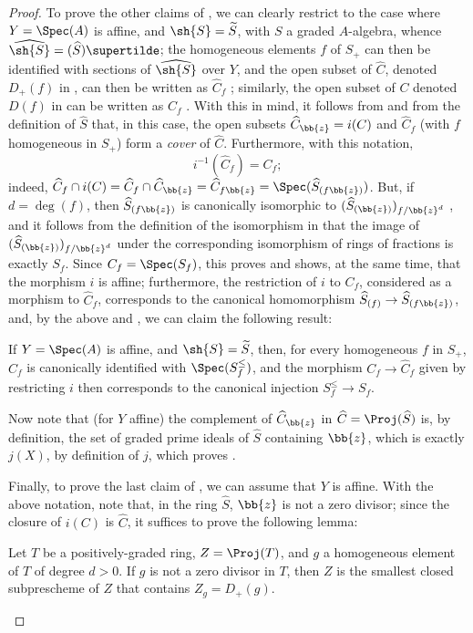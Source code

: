 \begin{proof}
To prove the other claims of , we can clearly restrict to the case where $Y=\Spec(A)$ is affine, and $\sh{S}=\widetilde{S}$, with $S$ a graded $A$-algebra, whence $\widehat{\sh{S}}=(\widehat{S})\supertilde$;
the homogeneous elements $f$ of $S_+$ can then be identified with sections of $\widehat{\sh{S}}$ over $Y$, and the open subset of $\widehat{C}$, denoted $D_+(f)$ in , can then be written as $\widehat{C}_f$ ;
similarly, the open subset of $C$ denoted $D(f)$ in  can be written as $C_f$ .
With this in mind, it follows from  and from the definition of $\widehat{S}$ that, in this case, the open subsets $\widehat{C}_{\bb{z}}=i(C)$ and $\widehat{C}_f$ (with $f$ homogeneous in $S_+$) form a \emph{cover} of $\widehat{C}$.
Furthermore, with this notation,
\[
\label{II.8.3.2.5}
  i^{-1}(\widehat{C}_f) = C_f;
\tag{8.3.2.5}
\]
indeed, $\widehat{C}_f\cap i(C) = \widehat{C}_f\cap\widehat{C}_{\bb{z}} = \widehat{C}_{f\bb{z}} = \Spec(\widehat{S}_{(f\bb{z})})$.
But, if $d=\deg(f)$, then $\widehat{S}_{(f\bb{z})}$ is canonically isomorphic to $(\widehat{S}_{(\bb{z})})_{f/\bb{z}^d}$ , and it follows from the definition of the isomorphism in  that the image of $(\widehat{S}_{(\bb{z})})_{f/\bb{z}^d}$ under the corresponding isomorphism of rings of fractions is exactly $S_f$.
Since $C_f=\Spec(S_f)$, this proves  and shows, at the same time, that the morphism $i$ is affine;
furthermore, the restriction of $i$ to $C_f$, considered as a morphism to $\widehat{C}_f$, corresponds  to the canonical homomorphism $\widehat{S}_{(f)}\to\widehat{S}_{(f\bb{z})}$, and, by the above and , we can claim the following result:
\begin{env}[8.3.2.6]
\label{II.8.3.2.6}
If $Y=\Spec(A)$ is affine, and $\sh{S}=\widetilde{S}$, then, for every homogeneous $f$ in $S_+$, $\widehat{C}_f$ is canonically identified with $\Spec(S_f^\leq)$, and the morphism $C_f\to\widehat{C}_f$ given by restricting $i$ then corresponds to the canonical injection $S_f^\leq\to S_f$.
\end{env}

Now note that (for $Y$ affine) the complement of $\widehat{C}_{\bb{z}}$ in $\widehat{C}=\Proj(\widehat{S})$
is, by definition, the set of graded prime ideals of $\widehat{S}$ containing $\bb{z}$, which is exactly $j(X)$, by definition of $j$, which proves .

Finally, to prove the last claim of , we can assume that $Y$ is affine.
With the above notation, note that, in the ring $\widehat{S}$, $\bb{z}$ is not a zero divisor;
since the closure of $i(C)$ is $\widehat{C}$, it suffices to prove the following lemma:
\begin{lemma}[8.3.2.7]
\label{II.8.3.2.7}
Let $T$ be a positively-graded ring, $Z=\Proj(T)$, and $g$ a homogeneous element of $T$ of degree $d>0$.
If $g$ is not a zero divisor in $T$, then $Z$ is the smallest closed subprescheme of $Z$ that contains $Z_g=D_+(g)$.
\end{lemma}


\end{proof}
